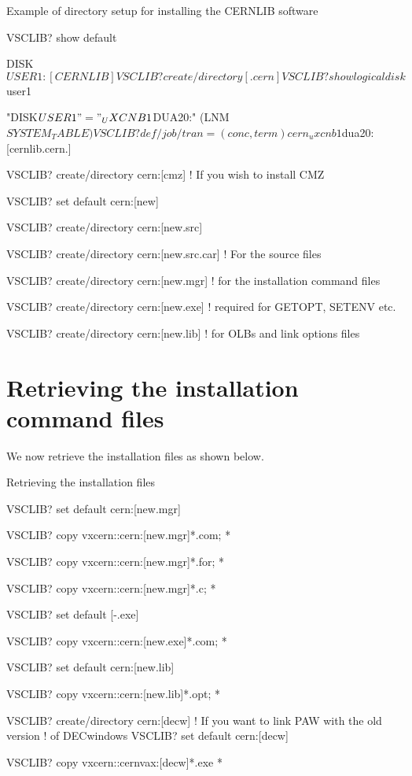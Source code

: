 \begin{XMPt}{Example of directory setup for installing the CERNLIB software}

VSCLIB? show default

  DISK$USER1:[CERNLIB]

VSCLIB? create/directory [.cern]

VSCLIB? show logical disk$user1

   "DISK$USER1" = "_UXCNB1$DUA20:" (LNM$SYSTEM_TABLE)

VSCLIB? def/job/tran=(conc,term) cern _uxcnb1$dua20:[cernlib.cern.]

VSCLIB? create/directory cern:[cmz]              ! If you wish to install CMZ

VSCLIB? set default cern:[new]

VSCLIB? create/directory cern:[new.src]          

VSCLIB? create/directory cern:[new.src.car]      ! For the source files

VSCLIB? create/directory cern:[new.mgr]          ! for the installation command files

VSCLIB? create/directory cern:[new.exe]          ! required for GETOPT, SETENV etc.

VSCLIB? create/directory cern:[new.lib]          ! for OLBs and link options files

\end{XMPt}

\section{Retrieving the installation command files}

We now retrieve the installation files as shown below.

\begin{XMPt}{Retrieving the installation files}

VSCLIB? set default cern:[new.mgr]

VSCLIB? copy vxcern::cern:[new.mgr]*.com; *

VSCLIB? copy vxcern::cern:[new.mgr]*.for; *

VSCLIB? copy vxcern::cern:[new.mgr]*.c; *

VSCLIB? set default [-.exe]

VSCLIB? copy vxcern::cern:[new.exe]*.com; *

VSCLIB? set default cern:[new.lib]

VSCLIB? copy vxcern::cern:[new.lib]*.opt; *

VSCLIB? create/directory cern:[decw] ! If you want to link PAW with the old version
                                     ! of DECwindows
VSCLIB? set default cern:[decw]

VSCLIB? copy vxcern::cernvax:[decw]*.exe *

\end{XMPt}

